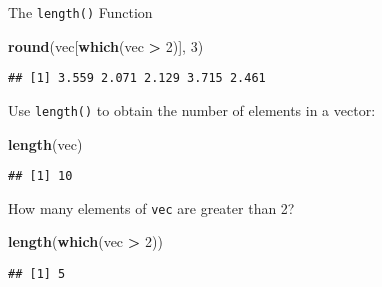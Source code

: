 \documentclass[ignorenonframetext,]{beamer}
\newenvironment{Shaded}{\begin{snugshade}}{\end{snugshade}}
\newcommand{\DecValTok}[1]{\textcolor[rgb]{0.00,0.00,0.81}{#1}}
\newcommand{\KeywordTok}[1]{\textcolor[rgb]{0.13,0.29,0.53}{\textbf{#1}}}
\newcommand{\NormalTok}[1]{#1}
\newcommand{\OperatorTok}[1]{\textcolor[rgb]{0.81,0.36,0.00}{\textbf{#1}}}
\newcommand{\StringTok}[1]{\textcolor[rgb]{0.31,0.60,0.02}{#1}}
\begin{document}
\begin{frame}[fragile]{The \texttt{length()} Function}
\protect\hypertarget{the-length-function}{}

\begin{Shaded}
\begin{Highlighting}[]
\KeywordTok{round}\NormalTok{(vec[}\KeywordTok{which}\NormalTok{(vec }\OperatorTok{>}\StringTok{ }\DecValTok{2}\NormalTok{)], }\DecValTok{3}\NormalTok{)}
\end{Highlighting}
\end{Shaded}

\begin{verbatim}
## [1] 3.559 2.071 2.129 3.715 2.461
\end{verbatim}

Use \texttt{length()} to obtain the number of elements in a vector:

\begin{Shaded}
\begin{Highlighting}[]
\KeywordTok{length}\NormalTok{(vec)}
\end{Highlighting}
\end{Shaded}

\begin{verbatim}
## [1] 10
\end{verbatim}

How many elements of \texttt{vec} are greater than 2?

\begin{Shaded}
\begin{Highlighting}[]
\KeywordTok{length}\NormalTok{(}\KeywordTok{which}\NormalTok{(vec }\OperatorTok{>}\StringTok{ }\DecValTok{2}\NormalTok{))}
\end{Highlighting}
\end{Shaded}

\begin{verbatim}
## [1] 5
\end{verbatim}

\end{frame}
\end{document}
